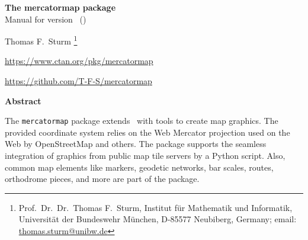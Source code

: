 \clearpage
\begin{center}
\begin{tcolorbox}[enhanced,hbox,tikznode,left=8mm,right=8mm,boxrule=0.4pt,
  colback=white,colframe=Blue_Gray,
  drop lifted shadow=Blue_Gray!50,arc is angular,
  before=\par\vspace*{5mm},after=\par\bigskip]
{\bfseries\LARGE The mercatormap package}\\[3mm]
{\large Manual for version \version\ (\datum)}
\end{tcolorbox}
{\large Thomas F.~Sturm%
  \footnote{Prof.~Dr.~Dr.~Thomas F.~Sturm, Institut f\"{u}r Mathematik und Informatik,
    Universit\"{a}t der Bundeswehr M\"{u}nchen, D-85577 Neubiberg, Germany;
     email: \href{mailto:thomas.sturm@unibw.de}{thomas.sturm@unibw.de}}\par\medskip
\normalsize%
\url{https://www.ctan.org/pkg/mercatormap}\par
\url{https://github.com/T-F-S/mercatormap}
}
\end{center}
\bigskip
\begin{absquote}
  \begin{center}\bfseries Abstract\end{center}
  The \texttt{mercatormap} package extends \tikzname\ with tools to
  create map graphics. The provided coordinate system relies on the
  Web Mercator projection used on the Web by OpenStreetMap and others.
  The package supports the seamless integration of graphics
  from public map tile servers by a Python script. Also, common map
  elements like markers, geodetic networks, bar scales, routes, orthodrome
  pieces, and more are part of the package.
\end{absquote}

\begin{tcolorbox}[breakable,enhanced jigsaw,before=\par\bigskip\noindent,
  title={Contents},fonttitle=\bfseries\Large,center title,
  colback=Blue_Gray!2!white,
  colframe=Blue_Gray,
  colbacktitle=Blue_Gray!5!white,
  coltitle=black,
  boxrule=0.4pt,arc is angular,
  enlargepage flexible=\baselineskip,pad at break*=3mm,
  ]
\makeatletter
{}
\makeatother
\end{tcolorbox}
